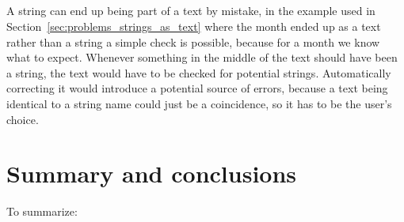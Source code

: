 \subsection{}

A {\bibtex} string can end up being part of a text by mistake, in the
example used in Section~\ref{sec:problems_strings_as_text} where the
month ended up as a text rather than a string a simple check is
possible, because for a month we know what to expect.  Whenever
something in the middle of the text should have been a string, the
text would have to be checked for potential strings.  Automatically
correcting it would introduce a potential source of errors, because a
text being identical to a string name could just be a coincidence, so
it has to be the user's choice.



\section{Summary and conclusions}

To summarize:








